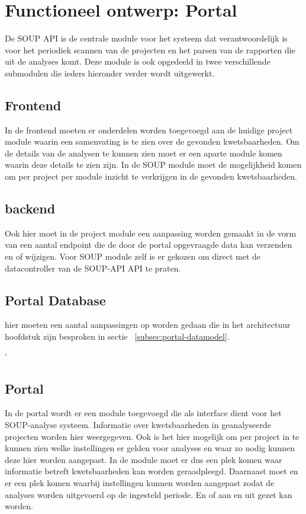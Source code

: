\chapter{Functioneel ontwerp: Portal}\label{ch:impl-Portal}
De SOUP API is de centrale module voor het systeem dat verantwoordelijk is voor het periodiek scannen van de projecten en het parsen van de rapporten die uit de analyses komt. Deze module is ook opgedeeld in twee verschillende submodulen die ieders hieronder verder wordt uitgewerkt.


\section{Frontend}
In de frontend moeten er onderdelen worden toegevoegd aan de huidige project module waarin een samenvating is te zien over de gevonden kwetsbaarheden. Om de details van de analysen te kunnen zien moet er een aparte module komen waarin deze details te zien zijn. In de SOUP module moet de mogelijkheid komen om per project per module inzicht te verkrijgen in de gevonden kwetsbaarheden.


\section{backend}
Ook hier moet in de project module een aanpassing worden gemaakt in de vorm van een aantal endpoint die de door de portal opgevraagde data kan verzenden en of wijzigen. Voor SOUP module zelf is er gekozen om direct met de datacontroller van de SOUP-API API te praten.

\section{Portal Database}
hier moeten een aantal aanpassingen op worden gedaan die in het architectuur hoofdstuk zijn besproken in sectie ~\ref{subsec:portal-datamodel}.


'


\section{Portal}\label{sec:portal}
In de portal wordt er een module toegevoegd die als interface dient voor het SOUP-analyse systeem. Informatie over kwetsbaarheden in geanalyseerde projecten worden hier weergegeven. Ook is het hier mogelijk om per project in te kunnen zien welke instellingen er gelden voor analyses en waar zo nodig kunnen deze hier worden aangepast.
In de module moet er dus een plek komen waar informatie betreft kwetsbaarheden kan worden geraadpleegd. Daarnaast moet en er een plek komen waarbij instellingen kunnen worden aangepast zodat de analyses worden uitgevoerd op de ingesteld periode. En of aan en uit gezet kan worden.
